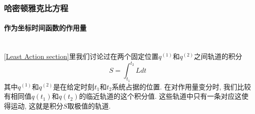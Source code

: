 \documentclass[a4paper,11pt]{article}
\theoremstyle{mystyle}
\begin{document}
\subsubsection{哈密顿雅克比方程}
\paragraph*{作为坐标时间函数的作用量}\quad\\
\ref{Least Action section}里我们讨论过在两个固定位置$q^{(1)}$和$q^{(2)}$之间轨道的积分
\begin{equation}\label{Action L}
  S=\int_{t_1}^{t_2}Ldt
\end{equation}
其中$q^{(1)}$和$q^{(2)}$是在给定时刻$t_1$和$t_2$系统占据的位置. 在对作用量变分时, 我们比较有相同值$q(t_1)$和$q(t_2)$的临近轨道的这个积分值. 这些轨道中只有一条对应这使得运动, 这就是积分$S$取极值的轨道.
\end{document}
